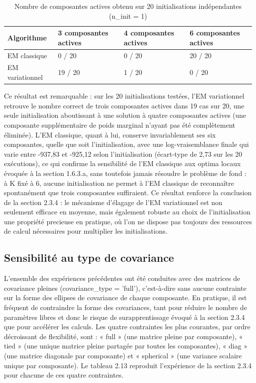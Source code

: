 \begin{table}[H]
\centering
\small
\setlength{\tabcolsep}{0.14cm}
\begin{tabular}{|p{3.54cm}|p{3.54cm}|p{3.54cm}|p{3.54cm}|}
\hline
\textbf{Algorithme} & \textbf{3 composantes actives} & \textbf{4 composantes actives} & \textbf{6 composantes actives} \\
\hline
EM classique & 0 / 20 & 0 / 20 & 20 / 20 \\
\hline
EM variationnel & 19 / 20 & 1 / 20 & 0 / 20 \\
\hline
\end{tabular}
\caption{Nombre de composantes actives obtenu sur 20 initialisations indépendantes (n\_init = 1)}
\label{tab:2_11}
\end{table}
Ce résultat est remarquable : sur les 20 initialisations testées, l'EM variationnel retrouve le nombre correct de trois composantes actives dans 19 cas sur 20, une seule initialisation aboutissant à une solution à quatre composantes actives (une composante supplémentaire de poids marginal n'ayant pas été complètement éliminée). L'EM classique, quant à lui, conserve invariablement ses six composantes, quelle que soit l'initialisation, avec une log-vraisemblance finale qui varie entre -937,83 et -925,12 selon l'initialisation (écart-type de 2,73 sur les 20 exécutions), ce qui confirme la sensibilité de l'EM classique aux optima locaux évoquée à la section 1.6.3.a, sans toutefois jamais résoudre le problème de fond : à K fixé à 6, aucune initialisation ne permet à l'EM classique de reconnaître spontanément que trois composantes suffiraient. Ce résultat renforce la conclusion de la section 2.3.4 : le mécanisme d'élagage de l'EM variationnel est non seulement efficace en moyenne, mais également robuste au choix de l'initialisation  une propriété precieuse en pratique, où l'on ne dispose pas toujours des ressources de calcul nécessaires pour multiplier les initialisations.

\subsection{Sensibilité au type de covariance}
L'ensemble des expériences précédentes ont été conduites avec des matrices de covariance pleines (covariance\_type = 'full'), c'est-à-dire sans aucune contrainte sur la forme des ellipses de covariance de chaque composante. En pratique, il est fréquent de contraindre la forme des covariances, tant pour réduire le nombre de paramètres libres  et donc le risque de surapprentissage évoqué à la section 2.3.4  que pour accélérer les calculs. Les quatre contraintes les plus courantes, par ordre décroissant de flexibilité, sont : « full » (une matrice pleine par composante), « tied » (une unique matrice pleine partagée par toutes les composantes), « diag » (une matrice diagonale par composante) et « spherical » (une variance scalaire unique par composante). Le tableau 2.13 reproduit l'expérience de la section 2.3.4 pour chacune de ces quatre contraintes.

